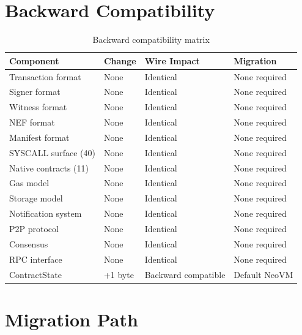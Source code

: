 \documentclass[11pt,a4paper]{article}
\begin{document}
\section{Backward Compatibility}
\label{sec:compatibility}

\begin{table}[H]
\centering
\begin{tabular}{lllp{4cm}}
\toprule
\textbf{Component} & \textbf{Change} & \textbf{Wire Impact} & \textbf{Migration} \\
\midrule
Transaction format   & None   & Identical  & None required \\
Signer format        & None   & Identical  & None required \\
Witness format       & None   & Identical  & None required \\
NEF format           & None   & Identical  & None required \\
Manifest format      & None   & Identical  & None required \\
SYSCALL surface (40) & None   & Identical  & None required \\
Native contracts (11)& None   & Identical  & None required \\
Gas model            & None   & Identical  & None required \\
Storage model        & None   & Identical  & None required \\
Notification system  & None   & Identical  & None required \\
P2P protocol         & None   & Identical  & None required \\
Consensus            & None   & Identical  & None required \\
RPC interface        & None   & Identical  & None required \\
ContractState        & +1 byte & Backward compatible & Default NeoVM \\
\bottomrule
\end{tabular}
\caption{Backward compatibility matrix}
\label{tab:compatibility}
\end{table}

\section{Migration Path}
\label{sec:migration}
\end{document}

